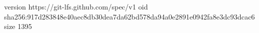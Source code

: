 version https://git-lfs.github.com/spec/v1
oid sha256:917d283848e40aec8db30dea7da62bd578da94a0e2891e0942fa8e3dc93dcac6
size 1395

